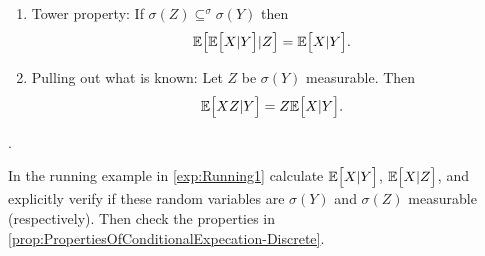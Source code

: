 \begin{proposition}
	\label{prop:PropertiesOfConditionalExpecation-Discrete}
	\begin{enumerate}
		\item Tower property: If $ \sigma(Z) \subseteq^\sigma \sigma(Y) $ then
		\[ \mathbb{E}\big[\mathbb{E}\big[X|Y\big]|Z\big] = \mathbb{E}\big[X|Y\big]. \]
		\item Pulling out what is known: Let $ Z $ be $ \sigma(Y) $ measurable. Then
		\[ \mathbb{E}\big[XZ|Y\big] = Z\mathbb{E}\big[X|Y\big]. \]
	\end{enumerate}.
\end{proposition}

\begin{example}
	In the running example in \autoref{exp:Running1} calculate $ \mathbb{E}\big[X|Y\big] $, $ \mathbb{E}\big[X|Z\big] $, and explicitly verify if these random variables are $ \sigma(Y) $ and $ \sigma(Z) $ measurable (respectively). Then check the properties in \autoref{prop:PropertiesOfConditionalExpecation-Discrete}.
\end{example}

